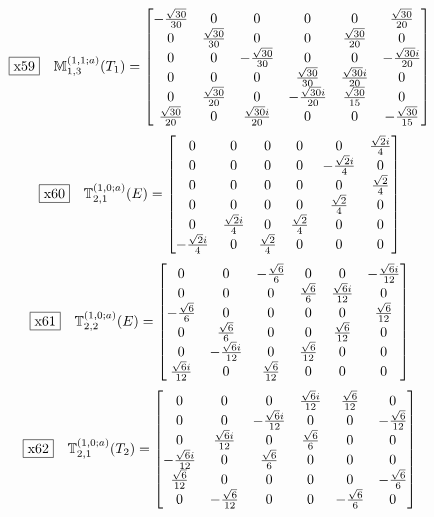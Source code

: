 \documentclass[fleqn,10pt,landscape]{jsarticle}
\begin{document}
\begin{dmath*}
\fbox{x59}\quad \mathbb{M}_{1,3}^{(1,1;a)}(T_{1})=\begin{bmatrix} - \frac{\sqrt{30}}{30} & 0 & 0 & 0 & 0 & \frac{\sqrt{30}}{20} \\ 0 & \frac{\sqrt{30}}{30} & 0 & 0 & \frac{\sqrt{30}}{20} & 0 \\ 0 & 0 & - \frac{\sqrt{30}}{30} & 0 & 0 & - \frac{\sqrt{30} i}{20} \\ 0 & 0 & 0 & \frac{\sqrt{30}}{30} & \frac{\sqrt{30} i}{20} & 0 \\ 0 & \frac{\sqrt{30}}{20} & 0 & - \frac{\sqrt{30} i}{20} & \frac{\sqrt{30}}{15} & 0 \\ \frac{\sqrt{30}}{20} & 0 & \frac{\sqrt{30} i}{20} & 0 & 0 & - \frac{\sqrt{30}}{15} \end{bmatrix}
\end{dmath*}
\begin{dmath*}
\fbox{x60}\quad \mathbb{T}_{2,1}^{(1,0;a)}(E)=\begin{bmatrix} 0 & 0 & 0 & 0 & 0 & \frac{\sqrt{2} i}{4} \\ 0 & 0 & 0 & 0 & - \frac{\sqrt{2} i}{4} & 0 \\ 0 & 0 & 0 & 0 & 0 & \frac{\sqrt{2}}{4} \\ 0 & 0 & 0 & 0 & \frac{\sqrt{2}}{4} & 0 \\ 0 & \frac{\sqrt{2} i}{4} & 0 & \frac{\sqrt{2}}{4} & 0 & 0 \\ - \frac{\sqrt{2} i}{4} & 0 & \frac{\sqrt{2}}{4} & 0 & 0 & 0 \end{bmatrix}
\end{dmath*}
\begin{dmath*}
\fbox{x61}\quad \mathbb{T}_{2,2}^{(1,0;a)}(E)=\begin{bmatrix} 0 & 0 & - \frac{\sqrt{6}}{6} & 0 & 0 & - \frac{\sqrt{6} i}{12} \\ 0 & 0 & 0 & \frac{\sqrt{6}}{6} & \frac{\sqrt{6} i}{12} & 0 \\ - \frac{\sqrt{6}}{6} & 0 & 0 & 0 & 0 & \frac{\sqrt{6}}{12} \\ 0 & \frac{\sqrt{6}}{6} & 0 & 0 & \frac{\sqrt{6}}{12} & 0 \\ 0 & - \frac{\sqrt{6} i}{12} & 0 & \frac{\sqrt{6}}{12} & 0 & 0 \\ \frac{\sqrt{6} i}{12} & 0 & \frac{\sqrt{6}}{12} & 0 & 0 & 0 \end{bmatrix}
\end{dmath*}
\begin{dmath*}
\fbox{x62}\quad \mathbb{T}_{2,1}^{(1,0;a)}(T_{2})=\begin{bmatrix} 0 & 0 & 0 & \frac{\sqrt{6} i}{12} & \frac{\sqrt{6}}{12} & 0 \\ 0 & 0 & - \frac{\sqrt{6} i}{12} & 0 & 0 & - \frac{\sqrt{6}}{12} \\ 0 & \frac{\sqrt{6} i}{12} & 0 & \frac{\sqrt{6}}{6} & 0 & 0 \\ - \frac{\sqrt{6} i}{12} & 0 & \frac{\sqrt{6}}{6} & 0 & 0 & 0 \\ \frac{\sqrt{6}}{12} & 0 & 0 & 0 & 0 & - \frac{\sqrt{6}}{6} \\ 0 & - \frac{\sqrt{6}}{12} & 0 & 0 & - \frac{\sqrt{6}}{6} & 0 \end{bmatrix}
\end{dmath*}
\end{document}
